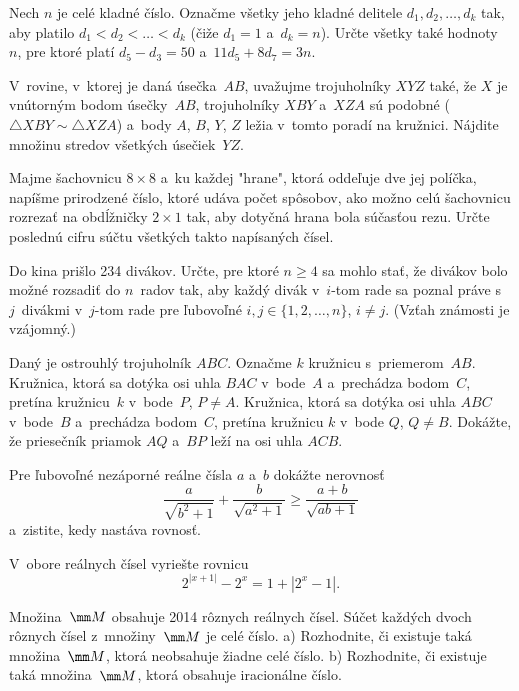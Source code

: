 {%
Nech $n$ je celé kladné číslo. Označme všetky jeho kladné
delitele $d_1,d_2,\dots,d_k$ tak, aby platilo
$d_1<d_2<\dots<d_k$ (čiže $d_1=1$ a~$d_k=n$). Určte všetky
také hodnoty~$n$, pre ktoré platí $d_5-d_3=50$ a~$11d_5+8d_7=3n$.}

{%
V~rovine, v~ktorej je daná úsečka~$AB$, uvažujme trojuholníky $XYZ$
také, že $X$ je vnútorným bodom úsečky~$AB$, trojuholníky $XBY$ a~$XZA$
sú podobné ($\triangle XBY\sim\triangle XZA$)
a~body $A$, $B$, $Y$, $Z$ ležia v~tomto poradí na
kružnici. Nájdite množinu stredov všetkých úsečiek~$YZ$.}

{%
Majme šachovnicu $8\times8$ a~ku každej "hrane", ktorá
oddeľuje dve jej políčka, napíšme prirodzené číslo, ktoré udáva počet
spôsobov, ako možno celú šachovnicu
rozrezať na obdĺžničky
$2\times1$ tak, aby dotyčná hrana bola
súčasťou rezu.
Určte poslednú cifru súčtu všetkých takto napísaných čísel.}

{%
Do kina prišlo 234 divákov. Určte, pre ktoré $n\ge4$ sa mohlo stať,
že divákov bolo možné rozsadiť do $n$~radov tak, aby každý divák
v~$i$-tom rade sa poznal práve s~$j$~divákmi v~$j$-tom rade pre
ľubovoľné $i,j\in\{1,2,\dots,n\}$, $i\ne j$.
(Vzťah známosti je vzájomný.)}

{%
Daný je ostrouhlý trojuholník $ABC$. Označme $k$ kružnicu s~priemerom~$AB$. Kružnica, ktorá sa dotýka osi uhla $BAC$ v~bode~$A$
a~prechádza bodom~$C$, pretína kružnicu~$k$ v~bode~$P$, $P\ne A$.
Kružnica, ktorá sa dotýka osi uhla $ABC$ v~bode~$B$
a~prechádza bodom~$C$, pretína kružnicu $k$ v~bode $Q$, $Q\ne B$.
Dokážte, že priesečník priamok $AQ$ a~$BP$ leží na osi uhla $ACB$.}

{%
Pre ľubovoľné nezáporné reálne čísla $a$ a~$b$ dokážte nerovnosť
$$
\frac{a}{\sqrt{b^2+1}}+\frac{b}{\sqrt{a^2+1}}\ge\frac{a+b}{\sqrt{ab+1}}
$$
a~zistite, kedy nastáva rovnosť.}

{%
V~obore reálnych čísel vyriešte rovnicu $$2^{|x+1|} - 2^x = 1 + |2^x - 1|.$$}

{%
Množina~$\mm M$ obsahuje 2014 rôznych reálnych čísel. Súčet každých dvoch rôznych čísel
z~množiny~$\mm M$ je celé číslo.
\ite a) Rozhodnite, či existuje taká množina~$\mm M$, ktorá neobsahuje žiadne celé číslo.
\ite b) Rozhodnite, či existuje taká množina~$\mm M$, ktorá obsahuje iracionálne číslo.}

